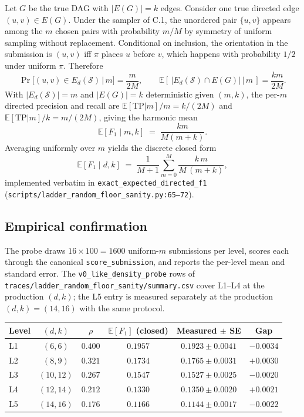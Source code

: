 Let $G$ be the true DAG with $|E(G)| = k$ edges. Consider one true directed edge $(u, v) \in E(G)$. Under the sampler of C.1, the unordered pair $\{u, v\}$ appears among the $m$ chosen pairs with probability $m/M$ by symmetry of uniform sampling without replacement. Conditional on inclusion, the orientation in the submission is $(u, v)$ iff $\pi$ places $u$ before $v$, which happens with probability $1/2$ under uniform $\pi$. Therefore
\begin{equation}
\Pr\bigl[(u, v) \in E_d(\mathcal{S}) \,\big|\, m\bigr] = \frac{m}{2M},
\qquad
\mathbb{E}[\,|E_d(\mathcal{S}) \cap E(G)| \,\big|\, m\,] = \frac{km}{2M}.
\end{equation}
With $|E_d(\mathcal{S})| = m$ and $|E(G)| = k$ deterministic given $(m, k)$, the per-$m$ directed precision and recall are $\mathbb{E}[\mathrm{TP}|m]/m = k/(2M)$ and $\mathbb{E}[\mathrm{TP}|m]/k = m/(2M)$, giving the harmonic mean
\begin{equation}
\mathbb{E}[F_1 \mid m, k] \;=\; \frac{km}{M(m + k)}.
\end{equation}
Averaging uniformly over $m$ yields the discrete closed form
\begin{equation}
\mathbb{E}[F_1 \mid d, k] \;=\; \frac{1}{M+1} \sum_{m=0}^{M} \frac{k\,m}{M\,(m + k)},
\label{eq:floor-closed}
\end{equation}
implemented verbatim in \texttt{exact\_expected\_directed\_f1} (\texttt{scripts/ladder\_random\_floor\_sanity.py:65--72}).

\subsection{Empirical confirmation}
\label{app:floor:empirical}

The probe draws $16 \times 100 = 1600$ uniform-$m$ submissions per level, scores each through the canonical \texttt{score\_submission}, and reports the per-level mean and standard error. The \texttt{v0\_like\_density\_probe} rows of \texttt{traces/ladder\_random\_floor\_sanity/summary.csv} cover L1--L4 at the production $(d, k)$; the L5 entry is measured separately at the production $(d, k) = (14, 16)$ with the same protocol.

\begin{center}
\small
\begin{tabular}{@{}l c c c c c@{}}
\toprule
Level & $(d, k)$ & $\rho$ & $\mathbb{E}[F_1]$ (closed) & Measured $\pm$ SE & Gap \\
\midrule
L1 & $(6, 6)$   & $0.400$ & $0.1957$ & $0.1923 \pm 0.0041$ & $-0.0034$ \\
L2 & $(8, 9)$   & $0.321$ & $0.1734$ & $0.1765 \pm 0.0031$ & $+0.0030$ \\
L3 & $(10, 12)$ & $0.267$ & $0.1547$ & $0.1527 \pm 0.0025$ & $-0.0020$ \\
L4 & $(12, 14)$ & $0.212$ & $0.1330$ & $0.1350 \pm 0.0020$ & $+0.0021$ \\
L5 & $(14, 16)$ & $0.176$ & $0.1166$ & $0.1144 \pm 0.0017$ & $-0.0022$ \\
\bottomrule
\end{tabular}
\end{center}

